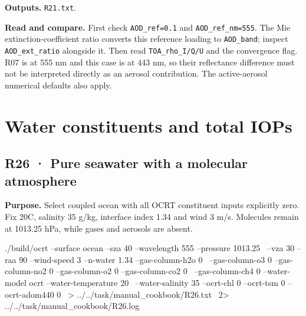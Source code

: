\textbf{Outputs. }\texttt{R21.txt}.

\textbf{Read and compare. }First check \texttt{AOD\_\allowbreak{}ref=0.1} and \texttt{AOD\_\allowbreak{}ref\_\allowbreak{}nm=555}. The Mie extinction-coefficient ratio converts this reference loading to \texttt{AOD\_\allowbreak{}band}; inspect \texttt{AOD\_\allowbreak{}ext\_\allowbreak{}ratio} alongside it. Then read \texttt{TOA\_\allowbreak{}rho\_\allowbreak{}I/Q/U} and the convergence flag. R07 is at 555 nm and this case is at 443 nm, so their reflectance difference must not be interpreted directly as an aerosol contribution. The active-aerosol numerical defaults also apply.

\clearpage

\section{Water constituents and total IOPs}

\label{sec:auto:09_cookbook:5}

\label{sec:cookbook_group:ocean}

\subsection{R26 · Pure seawater with a molecular atmosphere}
\label{sec:auto:09_cookbook:5.1}

\label{recipe:R26}

\textbf{Purpose. }Select coupled ocean with all OCRT constituent inputs explicitly zero. Fix 20\textdegree{}C, salinity 35 g/kg, interface index 1.34 and wind 3 m/s. Molecules remain at 1013.25 hPa, while gases and aerosols are absent.

\noindent\begin{minipage}{\linewidth}
\begin{ManualCode}

./build/ocrt --surface ocean --sza 40 --wavelength 555 --pressure 1013.25 \
  --vza 30 --raa 90 --wind-speed 3 --n-water 1.34 --gas-column-h2o 0 \
  --gas-column-o3 0 --gas-column-no2 0 --gas-column-o2 0 --gas-column-co2 0 \
  --gas-column-ch4 0 --water-model ocrt --water-temperature 20 \
  --water-salinity 35 --ocrt-chl 0 --ocrt-tsm 0 --ocrt-adom440 0 \
  > ../../task/manual_cookbook/R26.txt \
  2> ../../task/manual_cookbook/R26.log

\end{ManualCode}
\end{minipage}\par

